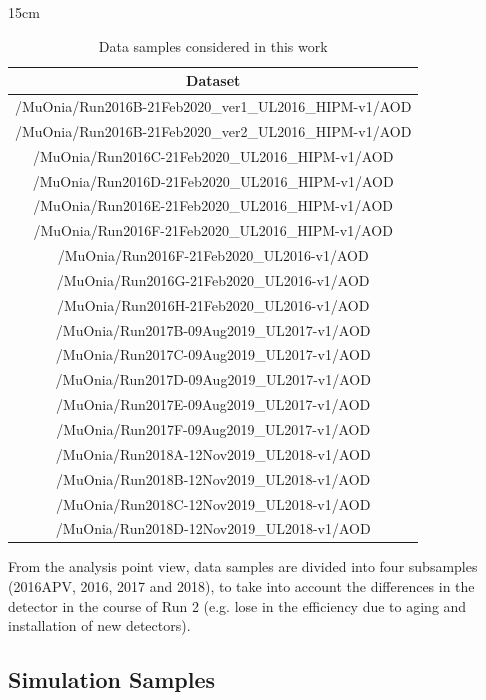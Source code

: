 \begin{table}[!htbp]{15cm}
  \caption{Data samples considered in this work}\label{tab:datasamples}
  \begin{tabular}{ c }
    Dataset \\ 
    \hline
    /MuOnia/Run2016B-21Feb2020\_ver1\_UL2016\_HIPM-v1/AOD \\
    /MuOnia/Run2016B-21Feb2020\_ver2\_UL2016\_HIPM-v1/AOD \\
    /MuOnia/Run2016C-21Feb2020\_UL2016\_HIPM-v1/AOD \\
    /MuOnia/Run2016D-21Feb2020\_UL2016\_HIPM-v1/AOD \\
    /MuOnia/Run2016E-21Feb2020\_UL2016\_HIPM-v1/AOD \\
    /MuOnia/Run2016F-21Feb2020\_UL2016\_HIPM-v1/AOD \\
    \hline
    /MuOnia/Run2016F-21Feb2020\_UL2016-v1/AOD \\
    /MuOnia/Run2016G-21Feb2020\_UL2016-v1/AOD \\
    /MuOnia/Run2016H-21Feb2020\_UL2016-v1/AOD \\
    \hline
    /MuOnia/Run2017B-09Aug2019\_UL2017-v1/AOD \\
    /MuOnia/Run2017C-09Aug2019\_UL2017-v1/AOD \\
    /MuOnia/Run2017D-09Aug2019\_UL2017-v1/AOD \\
    /MuOnia/Run2017E-09Aug2019\_UL2017-v1/AOD \\
    /MuOnia/Run2017F-09Aug2019\_UL2017-v1/AOD \\
    \hline
    /MuOnia/Run2018A-12Nov2019\_UL2018-v1/AOD \\
    /MuOnia/Run2018B-12Nov2019\_UL2018-v1/AOD \\
    /MuOnia/Run2018C-12Nov2019\_UL2018-v1/AOD \\
    /MuOnia/Run2018D-12Nov2019\_UL2018-v1/AOD \\
  \end{tabular}
\end{table}

From the analysis point view, data samples are divided into four subsamples (2016APV, 2016, 2017 and 2018), to take into account the differences in the detector in the course of Run 2 (e.g. lose in the efficiency due to aging and installation of new detectors).

\subsection{Simulation Samples}

